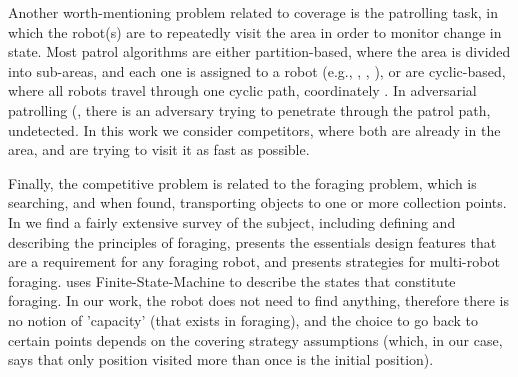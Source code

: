 Another worth-mentioning problem related to coverage is the patrolling task, in which the robot(s) are to repeatedly visit the area in order to monitor change in state. Most patrol algorithms are either partition-based, where the area is divided into sub-areas, and each one is assigned to a robot (e.g., \cite{guo2004towards}, \cite{guo2004coverage}, \cite{jung2002tracking}), or are cyclic-based, where all robots travel through one cyclic path, coordinately \cite{chevaleyre2004theoretical}. 
In adversarial patrolling (\cite{agmon2011multi, sless2014multi, agmon2008multi}, there is an adversary trying to penetrate through the patrol path, undetected. In this work we consider competitors, where both are already in the area, and are trying to visit it as fast as possible.

Finally, the competitive problem is related to the foraging problem, which is searching, and when found, transporting objects to one or more collection points. In \cite{winfield2009foraging} we find a fairly extensive survey of the subject, including defining and describing the principles of foraging, presents the essentials design features that are a requirement for any foraging robot, and presents strategies for multi-robot foraging. \cite{winfield2009foraging} uses Finite-State-Machine to describe the states that constitute foraging. In our work, the robot does not need to find anything, therefore there is no notion of 'capacity' (that exists in foraging), and the choice to go back to certain points depends on the covering strategy assumptions (which, in our case, says that only position visited more than once is the initial position).